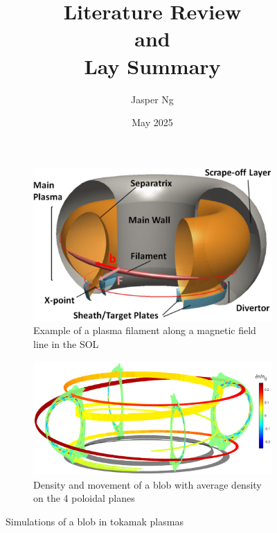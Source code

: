 \documentclass{article}
\title{\textbf{Literature Review \\and \\Lay Summary}}
\author{Jasper Ng}
\date{May 2025}
\begin{document}
\maketitle


\begin{figure}[h]
    \centering
    \begin{subfigure}[c]{0.45\linewidth}
        \centering
        \includegraphics[width=0.9\linewidth]{Fig1_plasma_filament.png}
        \normalsize{\caption{Example of a plasma filament along a magnetic field line in the SOL \cite{carralero_experimental_2015}}}
        \label{fig:fig1}
    \end{subfigure}
    \hspace{0.05\linewidth}
    \begin{subfigure}[c]{0.45\linewidth}
        \centering
        \includegraphics[width=0.9\linewidth]{Fig2_blob_movement.png}
        \normalsize{\caption{Density and movement of a blob with average density on the 4 poloidal planes \cite{nespoli_3d_2019}}}
        \label{fig:fig2}
    \end{subfigure}
    \normalsize{\caption{Simulations of a blob in tokamak plasmas}}
\end{figure}
\end{document}
